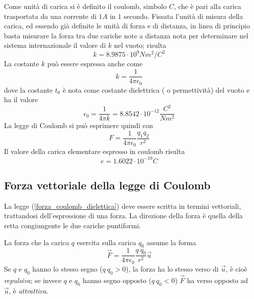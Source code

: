 \documentclass[class=book, crop=false, oneside, 12pt]{standalone}
\begin{document}
Come unità di carica si è definito il coulomb, simbolo \(C\), che è pari alla carica trasportata da una corrente di \(1 A\) in \(1\) secondo. \newline
Fissata l'unità di misura della carica, ed essendo già definite le unità di forza e di distanza, in linea di principio basta misurare la forza tra due cariche note a distanza nota per determinare nel sistema internazionale il valore di \(k\) nel vuoto; risulta
\begin{equation}
    k = 8.9875 \cdot 10^9 Nm^2 / C^2
\end{equation}
La costante \(k\) può essere espressa anche come 
\begin{equation*}
    k = \frac{1}{4 \pi \epsilon_0}
\end{equation*}
dove la costante \(t_0\) è nota come costante dielettrica ( o permettività) del vuoto e ha il valore
\begin{equation}
    \epsilon_0 = \frac{1}{4 \pi k} = 8.8542 \cdot 10^{-12} \frac{C^2}{N m^2}
\end{equation}
La legge di Coulomb si può esprimere quindi con
\begin{equation} \label{forza_coulomb_dielettica}
    F = \frac{1}{4 \pi \epsilon_0} \frac{q_1 q_2}{r^2}
\end{equation}
Il valore della carica elementare espresso in coulomb risulta 
\begin{equation}
    e = 1.6022 \cdot 10^{-19} C
\end{equation}

\subsection{Forza vettoriale della legge di Coulomb}

La legge (\ref{forza_coulomb_dielettica}) deve essere scritta in termini vettoriali, trattandosi dell'espressione di una forza.
La direzione della forza è quella della retta congiungente le due cariche puntiformi.

La forza che la carica \(q\) esercita sulla carica \(q_0\) assume la forma
\begin{equation}
    \overrightarrow{F} = \frac{1}{4 \pi \epsilon_0} \frac{q \ q_0}{r^2} \overrightarrow{u}
\end{equation}
Se \(q\) e \(q_0\) hanno lo stesso segno (\(q \ q_0 > 0\)), la forza ha lo stesso verso di \(\overrightarrow{u}\), è cioè \emph{repulsiva}; se invece \(q\) e \(q_0\) hanno segno opposto (\(q \ q_0 < 0\)) \(\overrightarrow{F}\) ha verso opposto ad \(\overrightarrow{u}\), è \emph{attrattiva}.
\end{document}
